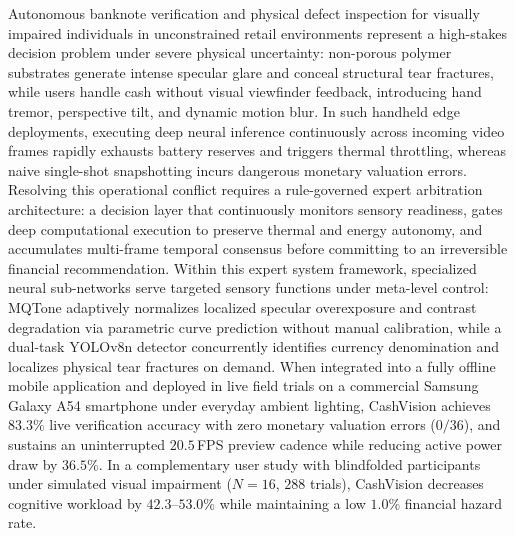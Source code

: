 \documentclass[final,5p,times,twocolumn,authoryear]{elsarticle}
\begin{document}
Autonomous banknote verification and physical defect inspection for visually impaired individuals in unconstrained retail environments represent a high-stakes decision problem under severe physical uncertainty: non-porous polymer substrates generate intense specular glare and conceal structural tear fractures, while users handle cash without visual viewfinder feedback, introducing hand tremor, perspective tilt, and dynamic motion blur. In such handheld edge deployments, executing deep neural inference continuously across incoming video frames rapidly exhausts battery reserves and triggers thermal throttling, whereas naive single-shot snapshotting incurs dangerous monetary valuation errors. Resolving this operational conflict requires a rule-governed expert arbitration architecture: a decision layer that continuously monitors sensory readiness, gates deep computational execution to preserve thermal and energy autonomy, and accumulates multi-frame temporal consensus before committing to an irreversible financial recommendation. Within this expert system framework, specialized neural sub-networks serve targeted sensory functions under meta-level control: MQTone adaptively normalizes localized specular overexposure and contrast degradation via parametric curve prediction without manual calibration, while a dual-task YOLOv8n detector concurrently identifies currency denomination and localizes physical tear fractures on demand. When integrated into a fully offline mobile application and deployed in live field trials on a commercial Samsung Galaxy A54 smartphone under everyday ambient lighting, CashVision achieves $83.3\%$ live verification accuracy with zero monetary valuation errors ($0/36$), and sustains an uninterrupted $20.5$\,FPS preview cadence while reducing active power draw by $36.5\%$. In a complementary user study with blindfolded participants under simulated visual impairment ($N=16$, $288$ trials), CashVision decreases cognitive workload by $42.3$--$53.0\%$ while maintaining a low $1.0\%$ financial hazard rate.
\end{document}
